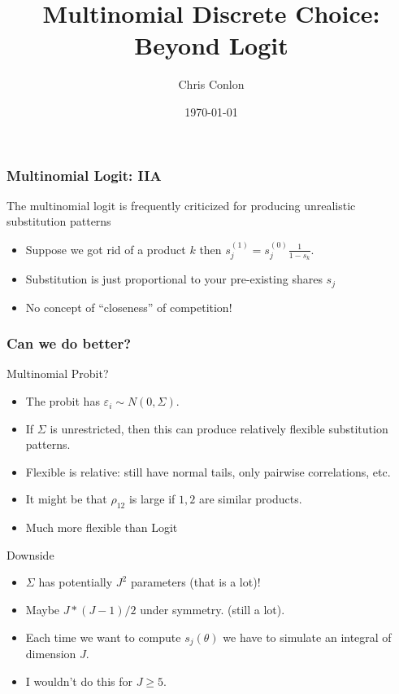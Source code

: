 \documentclass[xcolor=pdftex,dvipsnames,table,mathserif,aspectratio=169]{beamer}
\begin{document}
\title{Multinomial Discrete Choice: Beyond Logit}
\author{Chris Conlon}
\date{\today}

\frame{\titlepage}

\begin{frame}
\frametitle{Multinomial Logit: IIA}
The multinomial logit is frequently criticized for producing unrealistic substitution patterns
\begin{itemize}
\item Suppose we got rid of a product $k$ then $s_j^{(1)} = s_j^{(0)} \frac{1}{1- s_k}$.
\item Substitution is just proportional to your pre-existing shares $s_j$
\item No concept of ``closeness'' of competition!
\end{itemize}
\end{frame}

\begin{frame}
\frametitle{Can we do better?}
Multinomial Probit?
\begin{itemize}
\item The probit has $\varepsilon_i \sim N(0,\Sigma)$.
\item If $\Sigma$ is unrestricted, then this can produce relatively flexible substitution patterns.
\item Flexible is relative: still have normal tails, only pairwise correlations, etc.
\item It might be that $\rho_{12}$ is large if $1,2$ are similar products.
\item Much more flexible than Logit
\end{itemize}
Downside
\begin{itemize}
\item $\Sigma$ has potentially $J^2$ parameters (that is a lot)!
\item Maybe $J * (J-1)/2$ under symmetry. (still a lot).
\item Each time we want to compute $s_j(\theta)$ we have to simulate an integral of dimension $J$.
\item I wouldn't do this for $J \geq 5$.
\end{itemize}
\end{frame}
\end{document}
